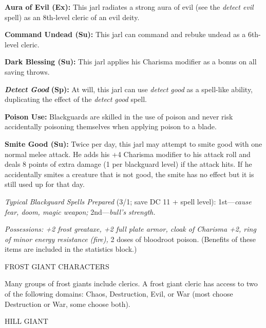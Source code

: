 \documentclass{article}
\begin{document}
\textbf{Aura of Evil (Ex):} This jarl radiates a strong aura of evil (see the \textit{detect 
evil }spell) as an 8th-level cleric of an evil deity.

\textbf{Command Undead (Su):} This jarl can command and rebuke undead as a 6th-level 
cleric. 

\textbf{Dark Blessing (Su):} This jarl applies his Charisma modifier as a bonus 
on all saving throws.

\textit{\textbf{Detect Good }}\textbf{(Sp):} At will, this jarl can use \textit{detect 
good }as a spell-like ability, duplicating the effect of the \textit{detect good 
}spell.

\textbf{Poison Use:} Blackguards are skilled in the use of poison and never risk 
accidentally poisoning themselves when applying poison to a blade.

\textbf{Smite Good (Su):} Twice per day, this jarl may attempt to smite good with 
one normal melee attack. He adds his +4 Charisma modifier to his attack roll and 
deals 8 points of extra damage (1 per blackguard level) if the attack hits. If 
he accidentally smites a creature that is not good, the smite has no effect but 
it is still used up for that day.

\textit{Typical Blackguard Spells Prepared }(3/1; save DC 11 + spell level): 1st---\textit{cause 
fear, doom, magic weapon; }2nd---\textit{bull's strength.}

\textit{Possessions: +2 frost greataxe, +2 full plate armor, cloak of Charisma 
+2, ring of minor energy resistance (fire), }2 doses of bloodroot poison. (Benefits 
of these items are included in the statistics block.)

\vspace{12pt}
FROST GIANT CHARACTERS

Many groups of frost giants include clerics. A frost giant cleric has access to 
two of the following domains: Chaos, Destruction, Evil, or War (most choose Destruction 
or War, some choose both).

\vspace{12pt}
HILL GIANT
\end{document}
